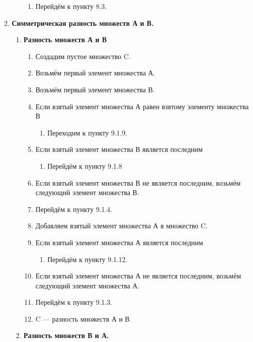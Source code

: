 \documentclass[a4paper,12pt]{extarticle}
\begin{document}
\begin{enumerate}
\begin{enumerate}[label*=\arabic*.]
\begin{enumerate}[label*=\arabic*.]
    \item Перейдём к пункту 8.3.
  \end{enumerate}
  \end{enumerate}
  \item \textbf{Симметрическая разность множеств А и В.}
  \begin{enumerate}[label*=\arabic*.]
    \item \textbf{Разность множеств А и В}
    \begin{enumerate}[label*=\arabic*.]
      \item Создадим пустое множество C.
      \item Возьмём первый элемент множества А.
      \item Возьмём первый элемент множества В.
      \item Если взятый элемент множества А равен взятому элементу множества В
      \begin{enumerate}[label*=\arabic*.]
        \item Переходим к пункту 9.1.9.
      \end{enumerate}
      \item Если взятый элемент множества В является последним
      \begin{enumerate}[label*=\arabic*.]
        \item Перейдём к пункту 9.1.8
      \end{enumerate}
      \item Если взятый элемент множества В не является последним, возьмём следующий элемент множества В.
      \item Перейдём к пункту 9.1.4.
      \item Добавляем взятый элемент множества А в множество C.
      \item Если взятый элемент множества А является последним
      \begin{enumerate}[label*=\arabic*.]
        \item Перейдём к пункту 9.1.12.
      \end{enumerate}
      \item Если взятый элемент множества А не является последним, возьмём следующий элемент множества А.
      \item Перейдём к пункту 9.1.3.
      \item C — разность множеств А и В.
    \end{enumerate}
    \item \textbf{Разность множеств В и А.}
    \begin{enumerate}[label*=\arabic*.]

\end{enumerate}
\end{enumerate}
\end{enumerate}
\end{document}
